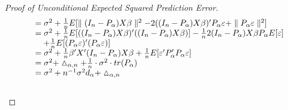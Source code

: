 \documentclass[Research_Module_ES.tex]{subfiles}
\begin{document}
\begin{proof}[Proof of Unconditional Expected Squared Prediction Error]
\begin{align*}
\begin{tabular}{ll}
	&$=\sigma^2+\frac{1}{n}E[\parallel (I_n-P_\alpha)X\beta\parallel^2-2((I_n-P_\alpha) X\beta)^\prime P_\alpha\varepsilon+\parallel P_\alpha\varepsilon\parallel^2]$\\
	&$=\sigma^2+\frac{1}{n}E[((I_n-P_\alpha)X\beta)^\prime((I_n-P_\alpha)X\beta)]-\frac{1}{n}2(I_n-P_\alpha)X\beta P_\alpha E[\varepsilon]$\\
	&$~~~+\frac{1}{n}E[(P_\alpha\varepsilon)^\prime (P_\alpha\varepsilon)]$\\
	&$=\sigma^2+\frac{1}{n}\beta^\prime X^\prime (I_n-P_\alpha)X\beta+\frac{1}{n}E[\varepsilon^\prime P_\alpha^\prime P_\alpha\varepsilon]$\\
	&$=\sigma^2+\vartriangle_{\alpha,n}+\frac{1}{n}\cdot\sigma^2\cdot tr(P_\alpha)$\\
	&$=\sigma^2+n^{-1}\sigma^2d_\alpha+\vartriangle_{\alpha,n}$
	\end{tabular}
	\end{align*}\\
\end{proof}	
\end{document}
